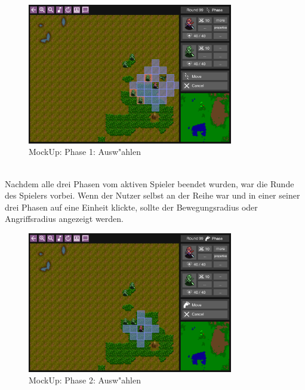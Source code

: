 \documentclass[12pt, titlepage]{scrartcl}
\begin{document}
			        \begin{figure}[H] 
    				    \centering
    				    \includegraphics[width=0.8\textwidth]{images/mockUps/Select.png}
    				    \caption{MockUp: Phase 1: Ausw"ahlen}
    				    \label{Select_1}
			        \end{figure}
			        \ \\ Nachdem alle drei Phasen vom aktiven Spieler beendet wurden, war die Runde des Spielers vorbei. Wenn der Nutzer selbst an der Reihe war und in einer seiner drei Phasen auf eine Einheit klickte, sollte der Bewegungsradius oder Angriffsradius angezeigt werden. \\
                    \begin{figure}[H] 
    				    \centering
    				    \includegraphics[width=0.8\textwidth]{images/mockUps/Select2.png}
    				    \caption{MockUp: Phase 2: Ausw"ahlen}
    				    \label{Select_2}
			        \end{figure} 
\end{document}
